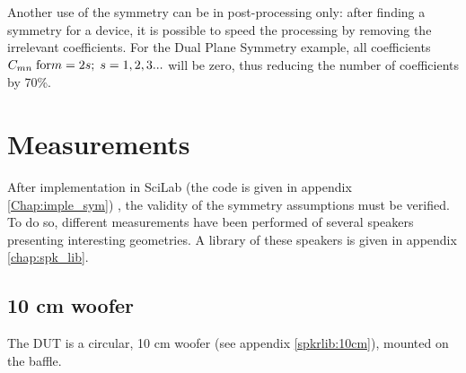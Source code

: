 \documentclass{report}
\begin{document}
Another use of the symmetry can be in post-processing only: after finding a symmetry for a device, it is possible to speed the processing by removing the irrelevant coefficients. For the Dual Plane Symmetry example, all coefficients  $C_{mn} \;  \textup{for}   m = 2s; \; s =1, 2, 3...$ will be zero, thus reducing the number of coefficients by 70\%.\\






\section{Measurements}

After implementation in SciLab (the code is given in appendix \ref{Chap:imple_sym}) , the validity of the symmetry assumptions must be verified. To do so, different measurements have been performed of several speakers presenting interesting geometries. A library of these speakers is given in appendix \ref{chap:spk_lib}. 


\subsection{10 cm woofer}

The DUT is a circular, 10 cm woofer (see appendix \ref{spkrlib:10cm}), mounted on the baffle. \\
\end{document}
